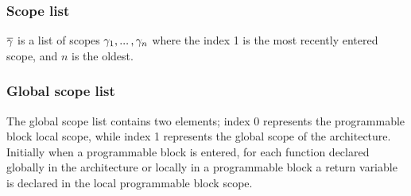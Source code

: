 \documentclass[UTF8]{article}
\begin{document}
\subsubsection*{Scope list}
$\overline{\gamma}$ is a list of scopes $\gamma_1 , ... \, , \gamma_n$ where the index 1 is the most recently entered scope, and $n$ is the oldest.

\subsubsection*{Global scope list}
The global scope list \gscopel{} contains two elements; index 0 represents the programmable block local scope, while index 1 represents the global scope of the architecture. Initially when a programmable block is entered, for each function declared globally in the architecture or locally in a programmable block a return variable is declared in the local programmable block scope.


%
%


\end{document}
